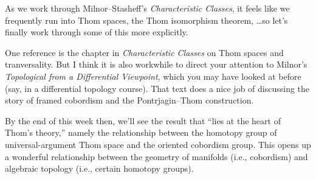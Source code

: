 \documentclass{homework}
\author{Jim Fowler}
\date{Week 14: Transversality}
\begin{document}
\maketitle

As we work through Milnor--Stasheff's \textit{Characteristic Classes},
it feels like we frequently run into Thom spaces, the Thom isomorphism
theorem, \ldots so let's finally work through some of this more
explicitly.

One reference is the chapter in \textit{Characteristic Classes} on
Thom spaces and tranversality.  But I think it is also workwhile to
direct your attention to Milnor's \textit{Topological from a
  Differential Viewpoint}, which you may have looked at before (say,
in a differential topology course).  That text does a nice job of
discussing the story of framed cobordism and the Pontrjagin--Thom
construction.

By the end of this week then, we'll see the result that ``lies at the
heart of Thom's theory,'' namely the relationship between the homotopy
group of universal-argument Thom space and the oriented cobordism
group.  This opens up a wonderful relationship between the geometry of
manifolds (i.e., cobordism) and algebraic topology (i.e., certain
homotopy groups).
\end{document}

